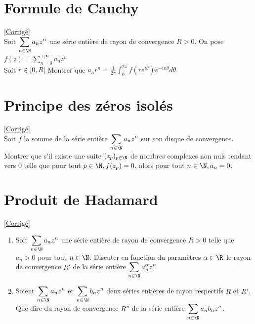 \documentclass{book}
\begin{document}
\section{Formule de Cauchy}
\label{Formule de Cauchy}
\textcolor{blue}{\hyperref[sec:formule-de-cauchy]{[Corrigé]}}\\
Soit $\displaystyle\sum_{n\in \N} a_nz^n$ une série entière de rayon de convergence $R>0$. On pose $f(z)=\displaystyle\sum\limits_{n=0}^{+\infty}a_nz^n$
\\Soit $r\in [0,R[$ Montrer que $a_nr^n=\displaystyle\frac{1}{2\pi}\int_0^{2\pi}f(re^{i\theta})e^{-in\theta}d\theta$

\section{Principe des zéros isolés}
\label{Principe des zéros isolés}
\textcolor{blue}{\hyperref[sec:principe-des-zeros-isoles]{[Corrigé]}}\\
Soit $f$ la somme de la série entière $\displaystyle\sum_{n\in \N} a_nz^n$ sur son disque de convergence. Montrer que s'il existe une suite $(z_p)_{p\in \N}$ de nombres complexes non nuls tendant vers $0$ telle que pour tout $p\in \N , f(z_p)=0$, alors pour tout $n \in \N, a_n=0$.

\section{Produit de Hadamard}
\label{Produit de Hadamard}
\textcolor{blue}{\hyperref[sec:produit-de-hadamard]{[Corrigé]}}\\
\begin{enumerate}[leftmargin=*]
	\item Soit $\displaystyle\sum_{n\in \N} a_nz^n$ une série entière de rayon de convergence $R>0$ telle que $a_n>0$ pour tout $n\in \N$. Discuter en fonction du paramètres $\alpha\in\R$ le rayon de convergence $R'$ de la série entière $\displaystyle\sum_{n\in \N} a_n^\alpha z^n$
	\item Soient $\displaystyle\sum_{n\in \N} a_nz^n$ et $\displaystyle\sum_{n\in \N} b_nz^n$ deux séries entières de rayon respectifs $R$ et $R'$. Que dire du rayon de convergence $R''$ de la série entière $\displaystyle\sum_{n\in \N} a_nb_nz^n$.
\end{enumerate}
\end{document}
